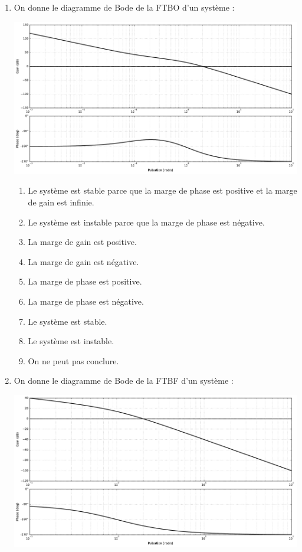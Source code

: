 \documentclass[10pt,fleqn]{article} %
\begin{document}
\begin{multicols}{2}
\begin{enumerate}
\item On donne le diagramme de Bode de la FTBO d'un système : 
\begin{center}
\includegraphics[width=\linewidth]{images/img_02}
\end{center}
\begin{enumerate}
\item Le système est stable parce que la marge de phase est positive et la marge de gain est infinie.
\item Le système est instable parce que la marge de phase est négative.
\item La marge de gain est positive. %
\item La marge de gain est négative. %
\item La marge de phase est positive.
\item La marge de phase est négative.
\item Le système est stable.
\item Le système est instable. %
\item On ne peut pas conclure. %
\end{enumerate}
\item On donne le diagramme de Bode de la FTBF d'un système : 
\begin{center}
\includegraphics[width=\linewidth]{images/img_03}

\end{center}
\end{enumerate}
\end{multicols}
\end{document}
